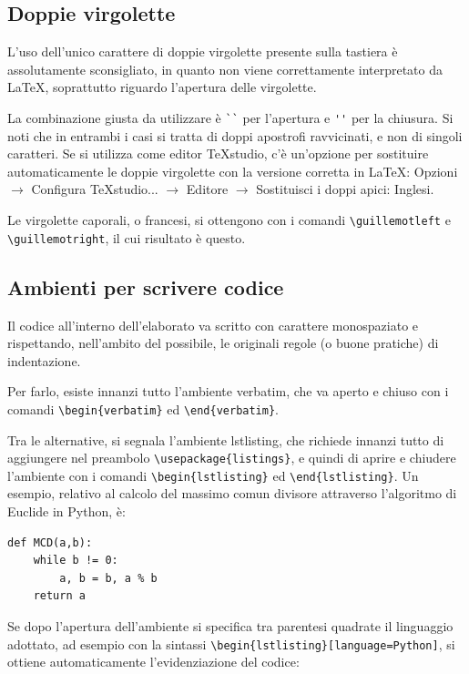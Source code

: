 \documentclass[12pt]{report}
\begin{document}
\subsection{Doppie virgolette}

L'uso dell'unico carattere di doppie virgolette presente sulla tastiera è assolutamente sconsigliato, in quanto non viene correttamente interpretato da \LaTeX, soprattutto riguardo l'apertura delle virgolette.

La combinazione giusta da utilizzare è \verb|``| per l'apertura e \verb|''| per la chiusura. Si noti che in entrambi i casi si tratta di doppi apostrofi ravvicinati, e non di singoli caratteri. Se si utilizza come editor TeXstudio, c'è un'opzione per sostituire automaticamente le doppie virgolette con la versione corretta in \LaTeX: Opzioni $\rightarrow$ Configura TeXstudio... $\rightarrow$ Editore $\rightarrow$ Sostituisci i doppi apici: Inglesi.

Le virgolette caporali, o francesi, si ottengono con i comandi \verb|\guillemotleft| e \verb|\guillemotright|, il cui risultato è \guillemotleft questo\guillemotright.


\subsection{Ambienti per scrivere codice}

Il codice all'interno dell'elaborato va scritto con carattere monospaziato e rispettando, nell'ambito del possibile, le originali regole (o buone pratiche) di indentazione.

Per farlo, esiste innanzi tutto l'ambiente verbatim, che va aperto e chiuso con i comandi \verb|\begin{verbatim}| ed \verb|\end{verbatim}|.

Tra le alternative, si segnala l'ambiente lstlisting, che richiede innanzi tutto di aggiungere nel preambolo \verb|\usepackage{listings}|, e quindi di aprire e chiudere l'ambiente con i comandi \verb|\begin{lstlisting}| ed \verb|\end{lstlisting}|. Un esempio, relativo al calcolo del massimo comun divisore attraverso l'algoritmo di Euclide in Python, è:

\begin{lstlisting}
def MCD(a,b):
	while b != 0:
		a, b = b, a % b
	return a
\end{lstlisting}

Se dopo l'apertura dell'ambiente si specifica tra parentesi quadrate il linguaggio adottato, ad esempio con la sintassi \verb|\begin{lstlisting}[language=Python]|, si ottiene automaticamente l'evidenziazione del codice:
\end{document}
